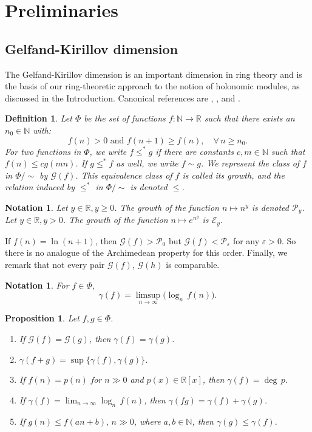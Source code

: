 \documentclass[12pt, a4paper]{amsart}
\newtheorem{proposition}[theorem]{Proposition}
\newtheorem{definition}[theorem]{Definition}
\newtheorem{notation}[theorem]{Notation}
\begin{document}
\section{Preliminaries}

\subsection{Gelfand-Kirillov dimension}
The Gelfand-Kirillov dimension is an important dimension in ring theory and is the basis of our ring-theoretic approach to the notion of holonomic modules, as discussed in the Introduction. Canonical references are \cite{KL}, \cite{Lorenz0}, and \cite[Chapter 8]{McConnell}.
\begin{definition}
Let $\Phi$ be the set of functions $f: \mathbb{N} \rightarrow \mathbb{R}$ such that there exists an $n_0 \in \mathbb{N}$ with:
\[f(n)>0\text{ and } f(n+1) \geq f(n), \quad\forall \, n \geq n_0.\]
For two functions in $\Phi$, we write $f \leq^* g$ if there are constants $c, m \in \mathbb{N}$ such that $f(n) \leq cg(mn)$. If $g \leq^* f$ as well, we write $f \sim g$. We represent the class of $f$ in $\Phi/\sim$ by $\mathcal{G}(f)$. This equivalence class of $f$ is called its \emph{growth}, and the relation induced by $ \leq^* $ in $\Phi/\sim$ is denoted $\leq$.
\end{definition}
\begin{notation}
Let $y \in \mathbb{R}, y \geq 0$. The growth of the function $n \mapsto n^y$ is denoted $\mathcal{P}_y$.
Let $y \in \mathbb{R}, y>0$. The growth of the function $n \mapsto e^{n^y}$ is $\mathcal{E}_y$.
\end{notation}
If $f(n)=\ln(n+1)$, then $\mathcal{G}(f) > \mathcal{P}_0$ but $\mathcal{G}(f) < \mathcal{P}_\varepsilon$ for any $\varepsilon >0$. So there is no analogue of the Archimedean property for this order.
Finally, we remark that not every pair $\mathcal{G}(f)$, $\mathcal{G}(h)$ is comparable.
\begin{notation}\label{asymptotic}
For $f \in \Phi$,
\[\gamma(f)= \limsup_{n \to \infty}\big(\log_n \, f(n)\big).\]
\end{notation}
\begin{proposition}\label{growth}
    Let $f,g \in \Phi$.
    \begin{enumerate}
        \item If $\mathcal{G}(f)=\mathcal{G}(g)$, then $\gamma(f)=\gamma(g)$.
        \item $\gamma(f+g)=\sup \{ \gamma(f), \gamma(g) \}$.
        \item If $f(n)=p(n)$ for $n\gg 0$ and $p(x) \in \mathbb{R}[x]$, then $\gamma(f)=\deg \, p$.
        \item If $\gamma(f)=\lim_{n \to \infty} \log_n \, f(n)$, then $\gamma(fg)= \gamma(f)+\gamma(g)$.
        \item If $g(n) \leq f(an+b), \, n\gg 0$, where $a,b \in \mathbb{N}$, then $\gamma(g) \leq \gamma(f)$.
    \end{enumerate}
\end{proposition}
\end{document}
